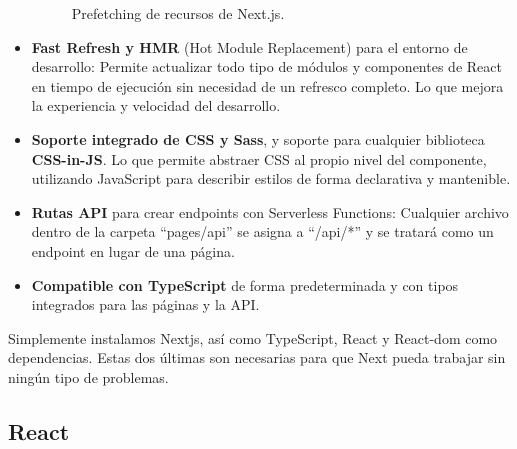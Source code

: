 \documentclass[12pt,twoside,titlepage]{report}
\begin{document}
\begin{itemize}
\begin{figure}[H]
            \caption{Prefetching de recursos de Next.js.}
            \label{fig:nextjs_prefetch}
        \end{figure}
    \item \textbf{Fast Refresh y HMR} (Hot Module Replacement) para el entorno de desarrollo: Permite actualizar todo tipo de módulos y componentes de React en tiempo de ejecución sin necesidad de un refresco completo. Lo que mejora la experiencia y velocidad del desarrollo. %

    \item \textbf{Soporte integrado de CSS y Sass}, y soporte para cualquier biblioteca \textbf{CSS-in-JS}. Lo que permite abstraer CSS al propio nivel del componente, utilizando JavaScript para describir estilos de forma declarativa y mantenible.
    \item \textbf{Rutas API} para crear endpoints con Serverless Functions: Cualquier archivo dentro de la carpeta ``pages/api'' se asigna a ``/api/*'' y se tratará como un endpoint en lugar de una página.
    \item \textbf{Compatible con TypeScript} de forma predeterminada y con tipos integrados para las páginas y la API.
\end{itemize}

Simplemente instalamos Nextjs, así como TypeScript, React y React-dom como dependencias. Estas dos últimas son necesarias para que Next pueda trabajar sin ningún tipo de problemas.

\subsection{React}
\end{document}
